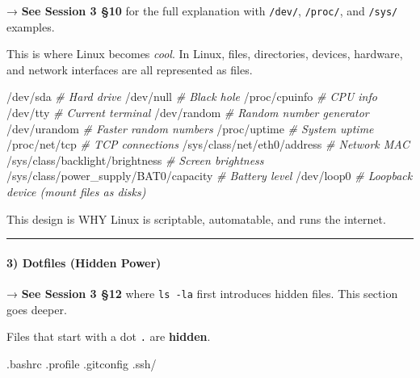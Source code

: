 \documentclass[
  english,
  paper=a4,
  oneside  ,captions=tableheading
]{scrartcl}
\newenvironment{Shaded}{}{}
\newcommand{\CommentTok}[1]{\textcolor[rgb]{0.38,0.63,0.69}{\textit{#1}}}
\newcommand{\ExtensionTok}[1]{#1}
\renewenvironment{quote}{\begin{customblockquote}\list{}{\rightmargin=0em\leftmargin=0em}%
\item\relax\color{blockquote-text}\ignorespaces}{\unskip\unskip\endlist\end{customblockquote}}
\begin{document}
\begin{quote}
→ \textbf{See Session 3 §10} for the full explanation with
\texttt{/dev/}, \texttt{/proc/}, and \texttt{/sys/} examples.
\end{quote}

This is where Linux becomes \emph{cool}. In Linux, files, directories,
devices, hardware, and network interfaces are all represented as files.

\begin{Shaded}
\begin{Highlighting}[]
\ExtensionTok{/dev/sda}          \CommentTok{\# Hard drive}
\ExtensionTok{/dev/null}         \CommentTok{\# Black hole}
\ExtensionTok{/proc/cpuinfo}     \CommentTok{\# CPU info}
\ExtensionTok{/dev/tty}          \CommentTok{\# Current terminal}
\ExtensionTok{/dev/random}       \CommentTok{\# Random number generator}
\ExtensionTok{/dev/urandom}      \CommentTok{\# Faster random numbers}
\ExtensionTok{/proc/uptime}      \CommentTok{\# System uptime}
\ExtensionTok{/proc/net/tcp}     \CommentTok{\# TCP connections}
\ExtensionTok{/sys/class/net/eth0/address}         \CommentTok{\# Network MAC}
\ExtensionTok{/sys/class/backlight/brightness}     \CommentTok{\# Screen brightness}
\ExtensionTok{/sys/class/power\_supply/BAT0/capacity} \CommentTok{\# Battery level}
\ExtensionTok{/dev/loop0}        \CommentTok{\# Loopback device (mount files as disks)}
\end{Highlighting}
\end{Shaded}

This design is WHY Linux is scriptable, automatable, and runs the
internet.

\begin{center}\rule{0.5\linewidth}{0.5pt}\end{center}

\paragraph{3) Dotfiles (Hidden Power)}\label{dotfiles-hidden-power}

\begin{quote}
→ \textbf{See Session 3 §12} where \texttt{ls\ -la} first introduces
hidden files. This section goes deeper.
\end{quote}

Files that start with a dot \texttt{.} are \textbf{hidden}.

\begin{Shaded}
\begin{Highlighting}[]
\ExtensionTok{.bashrc}
\ExtensionTok{.profile}
\ExtensionTok{.gitconfig}
\ExtensionTok{.ssh/}
\end{Highlighting}
\end{Shaded}
\end{document}
